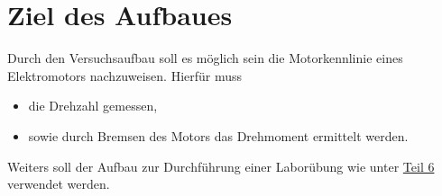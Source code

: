 \chapter{Ziel des Aufbaues}

Durch den Versuchsaufbau soll es möglich sein die Motorkennlinie eines Elektromotors nachzuweisen.
Hierfür muss

\begin{itemize}
    \item die Drehzahl gemessen,
    \item sowie durch Bremsen des Motors das Drehmoment ermittelt werden.
\end{itemize}

Weiters soll der Aufbau zur Durchführung einer Laborübung wie unter  \hyperref[labuebung]{Teil 6} verwendet werden.